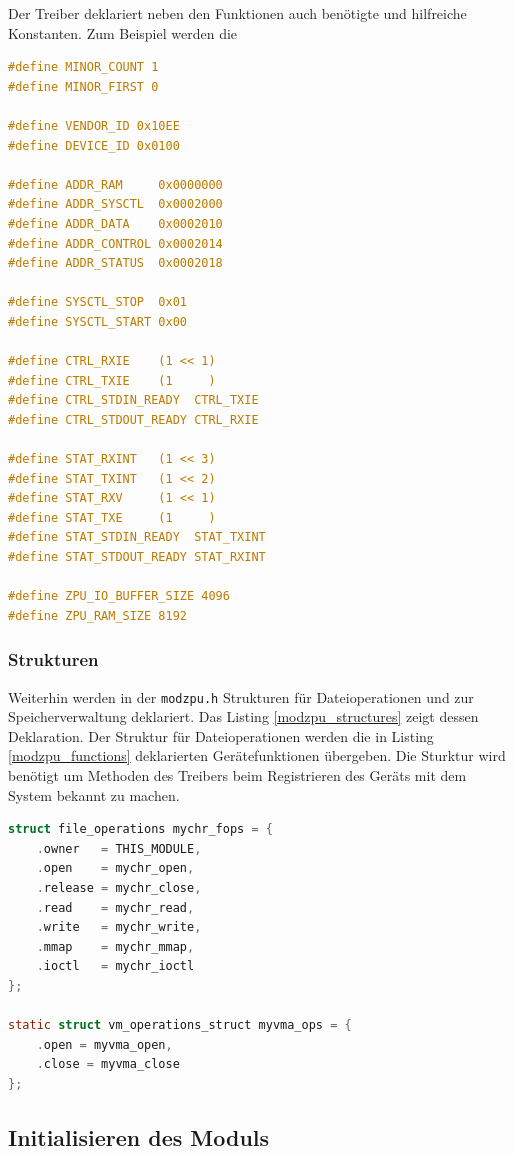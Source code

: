 \documentclass[11pt]{scrartcl}
\begin{document}
Der Treiber deklariert neben den Funktionen auch benötigte und hilfreiche Konstanten. Zum Beispiel werden die 
\begin{lstlisting}[language=C, firstnumber=13,label=modzpu_constants, caption=Verwendete Konstanten im Treibermodul, float=btp]
#define MINOR_COUNT 1
#define MINOR_FIRST 0

#define VENDOR_ID 0x10EE
#define DEVICE_ID 0x0100

#define ADDR_RAM     0x0000000
#define ADDR_SYSCTL  0x0002000
#define ADDR_DATA    0x0002010
#define ADDR_CONTROL 0x0002014
#define ADDR_STATUS  0x0002018

#define SYSCTL_STOP  0x01
#define SYSCTL_START 0x00

#define CTRL_RXIE    (1 << 1)
#define CTRL_TXIE    (1     )
#define CTRL_STDIN_READY  CTRL_TXIE
#define CTRL_STDOUT_READY CTRL_RXIE

#define STAT_RXINT   (1 << 3)
#define STAT_TXINT   (1 << 2)
#define STAT_RXV     (1 << 1)
#define STAT_TXE     (1     )
#define STAT_STDIN_READY  STAT_TXINT
#define STAT_STDOUT_READY STAT_RXINT

#define ZPU_IO_BUFFER_SIZE 4096
#define ZPU_RAM_SIZE 8192
\end{lstlisting}


\subsubsection{Strukturen}
Weiterhin werden in der \texttt{modzpu.h} Strukturen für Dateioperationen und zur Speicherverwaltung deklariert. Das Listing \ref{modzpu_structures} zeigt dessen Deklaration. Der Struktur für Dateioperationen werden die in Listing \ref{modzpu_functions} deklarierten Gerätefunktionen übergeben. Die Sturktur wird benötigt um Methoden des Treibers beim Registrieren des Geräts mit dem System bekannt zu machen. 

\begin{lstlisting}[language=C, firstnumber=69, label=modzpu_structures,caption=modzpu Strukturen, float=btp]
struct file_operations mychr_fops = {
	.owner   = THIS_MODULE,
	.open    = mychr_open,
	.release = mychr_close,
	.read    = mychr_read,
	.write   = mychr_write,
	.mmap    = mychr_mmap,
	.ioctl   = mychr_ioctl
};

static struct vm_operations_struct myvma_ops = {
	.open = myvma_open,
	.close = myvma_close
};

\end{lstlisting}


\subsection{Initialisieren des Moduls}
\end{document}
